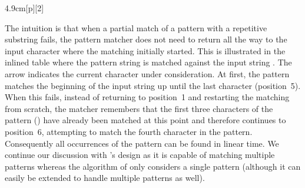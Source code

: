 {\begin{inParFigure}{4.9cm}[p][2]
  \vspace{0.5\baselineskip}%
\end{inParFigure}%
The intuition is that when a partial \gls{match} of a \gls{pattern} with a
repetitive substring fails, the \gls{pattern matcher} does not need to return
all the way to the input character where the matching initially started.
%
This is
illustrated in the inlined table where the \gls{pattern} string
 is matched against the input string .
%
The
arrow indicates the current character under consideration.
%
At first, the
\gls{pattern} matches the beginning of the input string up until the last
character (position~5).
%
When this fails, instead of returning to position~1 and
restarting the matching from scratch, the matcher remembers that the first three
characters of the \gls{pattern} () have already been matched at
this point and therefore continues to position~6, attempting to match the fourth
character in the \gls{pattern}.
%
Consequently all occurrences of the
\gls{pattern} can be found in linear time.
%
We continue our discussion with
\citeauthor{Aho1975}'s design as it is capable of matching multiple
\glspl{pattern} whereas the algorithm of \citeauthor{Knuth1977} only considers a
single \gls{pattern} (although it can easily be extended to handle multiple
\glspl{pattern} as well).

}
